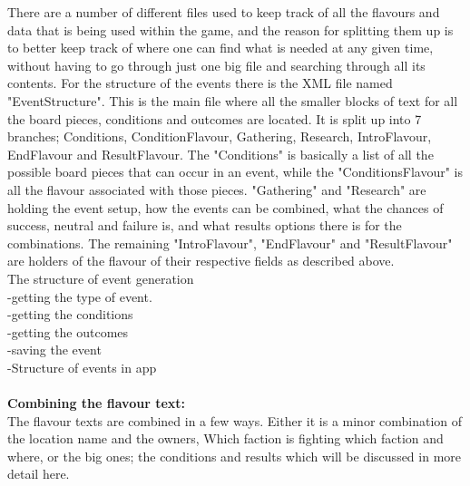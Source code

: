 There are a number of different files used to keep track of all the flavours and data that is being used within the game, and the reason for splitting them up is to better keep track of where one can find what is needed at any given time, without having to go through just one big file and searching through all its contents.
For the structure of the events there is the XML file named "EventStructure". This is the main file where all the smaller blocks of text for all the board pieces, conditions and outcomes are located. It is split up into 7 branches; Conditions, ConditionFlavour, Gathering, Research, IntroFlavour, EndFlavour and ResultFlavour.
The "Conditions" is basically a list of all the possible board pieces that can occur in an event, while the "ConditionsFlavour" is all the flavour associated with those pieces.
"Gathering" and "Research" are holding the event setup, how the events can be combined, what the chances of success, neutral and failure is, and what results options there is for the combinations.
The remaining "IntroFlavour", "EndFlavour" and "ResultFlavour" are holders of the flavour of their respective fields as described above.\\




The structure of event generation\\
-getting the type of event.\\
-getting the conditions\\
-getting the outcomes\\
-saving the event\\
-Structure of events in app\\\\

\textbf{Combining the flavour text:}\\

The flavour texts are combined in a few ways. Either it is a minor combination of the location name and the owners, Which faction is fighting which faction and where, or the big ones; the conditions and results which will be discussed in more detail here.\\

